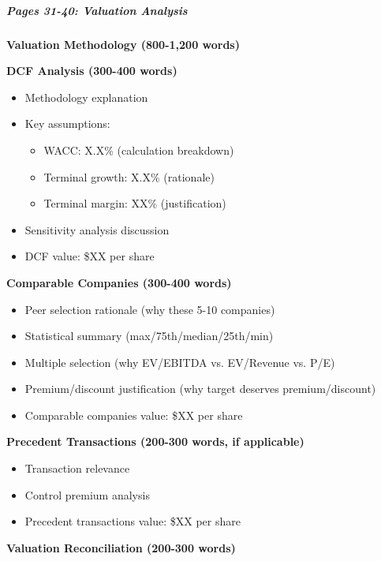 \documentclass[11pt]{article}
\begin{document}
\subparagraph{Pages 31-40: Valuation Analysis}\mbox{}\par

\textbf{Valuation Methodology (800-1,200 words)}


\textbf{DCF Analysis (300-400 words)}

\begin{itemize}[leftmargin=*,itemsep=2pt,topsep=2pt]
\item {} Methodology explanation
\item {} Key assumptions:
\begin{itemize}[leftmargin=*,itemsep=2pt,topsep=2pt]
\item {} WACC: X.X\% (calculation breakdown)
\item {} Terminal growth: X.X\% (rationale)
\item {} Terminal margin: XX\% (justification)
\end{itemize}
\item {} Sensitivity analysis discussion
\item {} DCF value: \$XX per share
\end{itemize}

\textbf{Comparable Companies (300-400 words)}

\begin{itemize}[leftmargin=*,itemsep=2pt,topsep=2pt]
\item {} Peer selection rationale (why these 5-10 companies)
\item {} Statistical summary (max/75th/median/25th/min)
\item {} Multiple selection (why EV/EBITDA vs. EV/Revenue vs. P/E)
\item {} Premium/discount justification (why target deserves premium/discount)
\item {} Comparable companies value: \$XX per share
\end{itemize}

\textbf{Precedent Transactions (200-300 words, if applicable)}

\begin{itemize}[leftmargin=*,itemsep=2pt,topsep=2pt]
\item {} Transaction relevance
\item {} Control premium analysis
\item {} Precedent transactions value: \$XX per share
\end{itemize}

\textbf{Valuation Reconciliation (200-300 words)}
\end{document}
